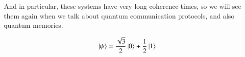 And in particular, these systems have very long coherence times, so we will see them again when we talk about quantum communication protocols, and also quantum memories.


\newpage
\begin{exercises}
\begin{equation*}
\left| \psi \right\rangle = \frac{\sqrt{3}}{2}\left| 0 \right\rangle + \frac{1}{2}\left| 1 \right\rangle
\end{equation*}


\end{exercises}

